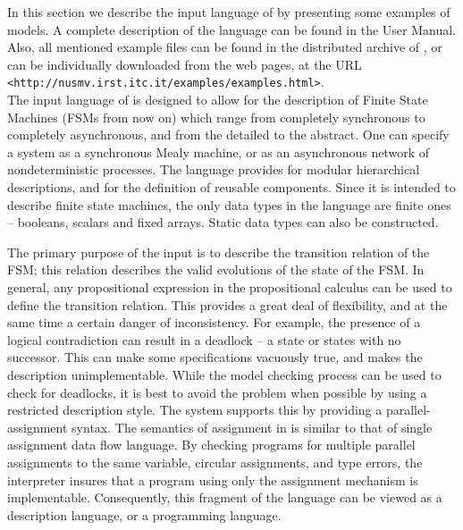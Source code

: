 In this section we describe the input language of \nusmv by
presenting some examples of \nusmv models. A complete description
of the \nusmv language can be found in the \NuSMV User Manual.
Also, all mentioned example files can be found in the distributed
archive of \NuSMV, or can be individually downloaded from the \nusmv
web pages, at the URL 
\texttt{<http://nusmv.irst.itc.it/examples/examples.html>}.
\\

The input language of \nusmv is designed to allow for the
description of Finite State Machines (FSMs from now on) which range from
completely synchronous to completely asynchronous, and from the detailed
to the abstract.
One can specify a system as a synchronous Mealy machine, or as
an asynchronous network of nondeterministic processes. The language
provides for modular hierarchical descriptions, and for the definition
of reusable components. Since it is intended to describe finite state
machines, the only data types in the language are finite ones --
booleans, scalars and fixed arrays. Static data types can also be
constructed.

The primary purpose of the \nusmv input is to describe the
transition relation of the FSM; this relation describes the valid
evolutions of the state of the FSM.
In general, any propositional expression in the propositional calculus
can be used to define the transition relation. This
provides a great deal of flexibility, and at the same time a certain
danger of inconsistency. For example, the presence of a logical
contradiction can result in a deadlock -- a state or states with no
successor. This can make some specifications vacuously true, and makes
the description unimplementable.  While the model checking process can
be used to check for deadlocks, it is best to avoid the problem when
possible by using a restricted description style. The \nusmv system
supports this by providing a parallel-assignment syntax. The semantics
of assignment in \nusmv is similar to that of single assignment data
flow language. By checking programs for multiple parallel assignments to
the same variable, circular assignments, and type errors, the
interpreter insures that a program using only the assignment mechanism
is implementable. Consequently, this fragment of the language can be
viewed as a description language, or a programming language.

